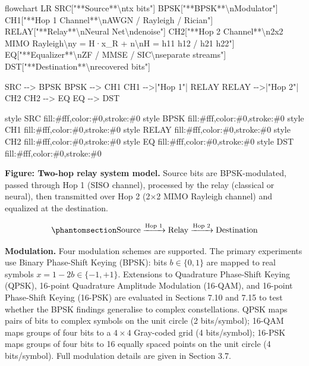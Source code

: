 \documentclass[
  english,
  12pt,
  12pt,
  a4paper,
  oneside]{report}
\newenvironment{Shaded}{}{}
\newcommand{\NormalTok}[1]{#1}
\begin{document}
\begin{Shaded}
\begin{Highlighting}[]
\NormalTok{flowchart LR}
\NormalTok{    SRC["**Source**\textbackslash{}ntx bits"]}
\NormalTok{    BPSK["**BPSK**\textbackslash{}nModulator"]}
\NormalTok{    CH1["**Hop 1 Channel**\textbackslash{}nAWGN / Rayleigh / Rician"]}
\NormalTok{    RELAY["**Relay**\textbackslash{}nNeural Net\textbackslash{}ndenoise"]}
\NormalTok{    CH2["**Hop 2 Channel**\textbackslash{}n2x2 MIMO Rayleigh\textbackslash{}ny = H·x\_R + n\textbackslash{}nH = h11 h12 / h21 h22"]}
\NormalTok{    EQ["**Equalizer**\textbackslash{}nZF / MMSE / SIC\textbackslash{}nseparate streams"]}
\NormalTok{    DST["**Destination**\textbackslash{}nrecovered bits"]}

\NormalTok{    SRC {-}{-}\textgreater{} BPSK}
\NormalTok{    BPSK {-}{-}\textgreater{} CH1}
\NormalTok{    CH1 {-}{-}\textgreater{}|"Hop 1"| RELAY}
\NormalTok{    RELAY {-}{-}\textgreater{}|"Hop 2"| CH2}
\NormalTok{    CH2 {-}{-}\textgreater{} EQ}
\NormalTok{    EQ {-}{-}\textgreater{} DST}

\NormalTok{    style SRC   fill:\#fff,color:\#0,stroke:\#0}
\NormalTok{    style BPSK  fill:\#fff,color:\#0,stroke:\#0}
\NormalTok{    style CH1   fill:\#fff,color:\#0,stroke:\#0}
\NormalTok{    style RELAY fill:\#fff,color:\#0,stroke:\#0}
\NormalTok{    style CH2   fill:\#fff,color:\#0,stroke:\#0}
\NormalTok{    style EQ    fill:\#fff,color:\#0,stroke:\#0}
\NormalTok{    style DST   fill:\#fff,color:\#0,stroke:\#0}
\end{Highlighting}
\end{Shaded}

\textbf{Figure: Two-hop relay system model.} Source bits are BPSK-modulated, passed through Hop 1 (SISO channel), processed by the relay (classical or neural), then transmitted over Hop 2 (2×2 MIMO Rayleigh channel) and equalized at the destination.

\begin{equation}\protect\phantomsection\label{eq:two-hop-system}{\text{Source} \xrightarrow{\text{Hop 1}} \text{Relay} \xrightarrow{\text{Hop 2}} \text{Destination}
}\end{equation}

\textbf{Modulation.} Four modulation schemes are supported. The primary experiments use Binary Phase-Shift Keying (BPSK): bits \(b \in \{0, 1\}\) are mapped to real symbols \(x = 1 - 2b \in \{-1, +1\}\). Extensions to Quadrature Phase-Shift Keying (QPSK), 16-point Quadrature Amplitude Modulation (16-QAM), and 16-point Phase-Shift Keying (16-PSK) are evaluated in Sections 7.10 and 7.15 to test whether the BPSK findings generalise to complex constellations. QPSK maps pairs of bits to complex symbols on the unit circle (2 bits/symbol); 16-QAM maps groups of four bits to a \(4 \times 4\) Gray-coded grid (4 bits/symbol); 16-PSK maps groups of four bits to 16 equally spaced points on the unit circle (4 bits/symbol). Full modulation details are given in Section 3.7.
\end{document}
